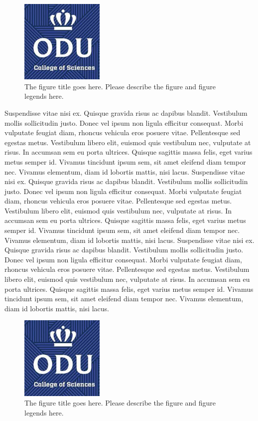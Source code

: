 \begin{figure}[tbh]
  \centering
  \includegraphics[height=4cm]{Figures/cos1.jpeg}
  \caption[The figure title goes here.]{The figure title goes here. Please describe the figure and figure legends here.}
  \label{fig:cos1_19}
\end{figure}

Suspendisse vitae nisi ex. Quisque gravida risus ac dapibus blandit. Vestibulum mollis sollicitudin justo. Donec vel ipsum non ligula efficitur consequat. Morbi vulputate feugiat diam, rhoncus vehicula eros posuere vitae. Pellentesque sed egestas metus. Vestibulum libero elit, euismod quis vestibulum nec, vulputate at risus. In accumsan sem eu porta ultrices. Quisque sagittis massa felis, eget varius metus semper id. Vivamus tincidunt ipsum sem, sit amet eleifend diam tempor nec. Vivamus elementum, diam id lobortis mattis, nisi lacus. Suspendisse vitae nisi ex. Quisque gravida risus ac dapibus blandit. Vestibulum mollis sollicitudin justo. Donec vel ipsum non ligula efficitur consequat. Morbi vulputate feugiat diam, rhoncus vehicula eros posuere vitae. Pellentesque sed egestas metus. Vestibulum libero elit, euismod quis vestibulum nec, vulputate at risus. In accumsan sem eu porta ultrices. Quisque sagittis massa felis, eget varius metus semper id. Vivamus tincidunt ipsum sem, sit amet eleifend diam tempor nec. Vivamus elementum, diam id lobortis mattis, nisi lacus. Suspendisse vitae nisi ex. Quisque gravida risus ac dapibus blandit. Vestibulum mollis sollicitudin justo. Donec vel ipsum non ligula efficitur consequat. Morbi vulputate feugiat diam, rhoncus vehicula eros posuere vitae. Pellentesque sed egestas metus. Vestibulum libero elit, euismod quis vestibulum nec, vulputate at risus. In accumsan sem eu porta ultrices. Quisque sagittis massa felis, eget varius metus semper id. Vivamus tincidunt ipsum sem, sit amet eleifend diam tempor nec. Vivamus elementum, diam id lobortis mattis, nisi lacus.




\begin{figure}[tbh]
  \centering
  \includegraphics[height=4cm]{Figures/cos1.jpeg}
  \caption[The figure title goes here.]{The figure title goes here. Please describe the figure and figure legends here.}
  \label{fig:cos1_20}
\end{figure}


